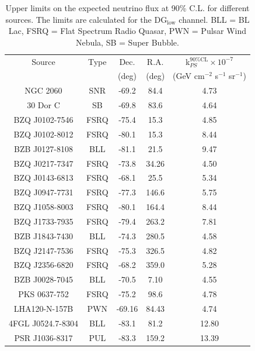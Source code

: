 \begin{table}
  \centering
  \begin{tabular}{|c|c|c|c|c|}
    \hline
    Source & Type & Dec. & R.A. & k$^{\text{90\%CL}}_{PS} \times 10^{-7}$ \\
    & & (deg) & (deg) & (GeV cm$^{-2}$ s$^{-1}$ sr$^{-1}$) \\
    \hline
    NGC 2060 & SNR & -69.2 & 84.4 & 4.73 \\
    30 Dor C & SB & -69.8 & 83.6 & 4.64 \\
    BZQ J0102-7546 & FSRQ & -75.4 & 15.3 & 4.85 \\
    BZQ J0102-8012 & FSRQ &-80.1 & 15.3 & 8.44  \\
    BZB J0127-8108 & BLL & -81.1 & 21.5 & 9.47 \\
    BZQ J0217-7347 & FSRQ &-73.8 & 34.26 & 4.50 \\
    BZQ J0143-6813 & FSRQ &-68.1 & 25.5 & 5.34 \\
    BZQ J0947-7731 & FSRQ &-77.3 & 146.6 & 5.75 \\
    BZQ J1058-8003 & FSRQ & -80.1 & 164.4 & 8.44 \\
    BZQ J1733-7935 & FSRQ &-79.4 & 263.2 & 7.81 \\
    BZB J1843-7430 & BLL& -74.3 & 280.5 & 4.58 \\
    BZQ J2147-7536 & FSRQ &-75.3 & 326.5 & 4.82 \\
    BZQ J2356-6820 & FSRQ&-68.2 & 359.0 & 5.28 \\
    BZB J0028-7045 & BLL&-70.5 & 7.10 & 4.55 \\
    PKS 0637-752 & FSRQ &-75.2 & 98.6 & 4.78 \\
    LHA120-N-157B & PWN & -69.16 & 84.43 & 4.74 \\
    4FGL J0524.7-8304 & BLL & -83.1 & 81.2 & 12.80 \\
    PSR J1036-8317 & PUL & -83.3 & 159.2 & 13.39 \\
    \hline
  \end{tabular}
  \caption{Upper limits on the expected neutrino flux at 90\% C.L. for different sources. The limits are calculated for the DG$_{\text{low}}$ channel. BLL = BL Lac, FSRQ = Flat Spectrum Radio Quasar, PWN = Pulsar Wind Nebula, SB = Super Bubble.}
  \label{tab:source_limits}
\end{table}
 
